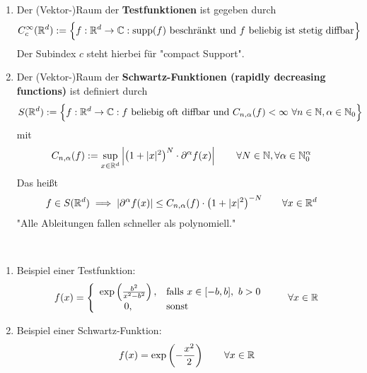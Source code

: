 \begin{defi}\
	\begin{enumerate}[label=(\alph*)]
		\item Der (Vektor-)Raum der \textbf{Testfunktionen} ist gegeben durch
		\begin{align*}
			C_c^\infty(\mathbb{R}^d):=\Big\lbrace f:\mathbb{R}^d\to\mathbb{C}:\operatorname{supp}(f)\text{ beschränkt und $f$ beliebig ist stetig diffbar}\Big\rbrace
		\end{align*}
		Der Subindex $c$ steht hierbei für "compact Support".
		\item Der (Vektor-)Raum der \textbf{Schwartz-Funktionen (rapidly decreasing functions)} ist definiert durch
		\begin{align*}
			S(\mathbb{R}^d)&:=\Big\lbrace f:\mathbb{R}^d\to\mathbb{C}: f\text{ beliebig oft diffbar und }C_{n,\alpha}(f)<\infty~\forall n\in\mathbb{N},\alpha\in\mathbb{N}_0\Big\rbrace
		\end{align*}
		mit
		\begin{align*}
			C_{n,\alpha}(f)&:=\sup\limits_{x\in\mathbb{R}^d}\left|\left(1+|x|^2\right)^N\cdot\partial^\alpha f(x)\right|\qquad\forall N\in\mathbb{N},\forall\alpha\in\mathbb{N}_0^\alpha
		\end{align*}
		Das heißt
		\begin{align*}
			f\in S(\mathbb{R}^d) &\implies\left|\partial^\alpha f(x)\right|\leq C_{n,\alpha}(f)\cdot\big(1+|x|^2\big)^{-N}\qquad\forall x\in\mathbb{R}^d
		\end{align*}
		"Alle Ableitungen fallen schneller als polynomiell."
	\end{enumerate}
\end{defi}

\begin{beisp}\
	\begin{enumerate}
		\item Beispiel einer Testfunktion:
		\begin{align*}
			f(x)=\left\lbrace\begin{array}{cl}
				\exp\left(\frac{b^2}{x^2-b^2}\right), &\text{falls } x\in[-b,b],~b>0\\
				0, &\text{sonst }
			\end{array}\right.\qquad\forall x\in\mathbb{R}
		\end{align*}
		\item Beispiel einer Schwartz-Funktion:
		\begin{align*}
			f(x)=\exp\left(-\frac{x^2}{2}\right)\qquad\forall x\in\mathbb{R}
		\end{align*}
	\end{enumerate}
\end{beisp}


